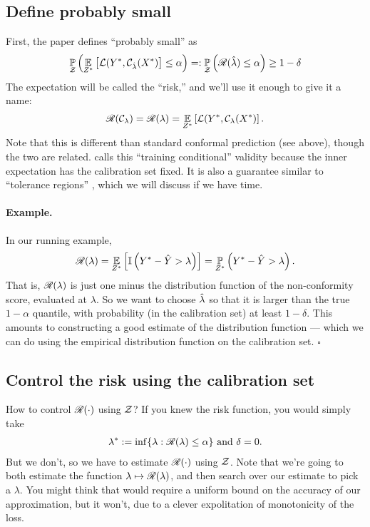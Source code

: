 \documentclass[twoside,11pt]{article}
\numberwithin{equation}{section}
\begin{document}
\subsection{Define probably small} 
First, the paper defines ``probably small'' as
%
\begin{align*}
%
\p{\calset}{
    \expect{\znew}{\loss(\ynew, \cfun_{\lambdahat}(\xnew)} \le \alpha
} =:
\p{\calset}{\risk(\lambdahat) \le \alpha}
\ge 1 - \delta
%
\end{align*}
%
The expectation will be called the ``risk,'' and we'll use it enough
to give it a name:
%
\begin{align*}
%
\risk(\cfun_\lambda) = \risk(\lambda) =
    \expect{\znew}{\loss(\ynew, \cfun_{\lambda}(\xnew)}.
%
\end{align*}
%
Note that this is different than standard conformal prediction (see above),
though the two are related.  \citet{vovk:2012:conditionalconformal} calls this
``training conditional'' validity because the inner expectation has the
calibration set fixed.  It is also a guarantee similar to ``tolerance regions''
\citep{krishnamoorthy:2009:statisticaltoleranceregions}, which we will discuss
if we have time.

\paragraph{Example. }
In our running example,
%
\begin{align*}
%
\risk(\lambda) =
    \expect{\znew}{\ind{\ynew - \yhat > \lambda}} = 
    \p{\znew}{\ynew - \yhat > \lambda}.
%
\end{align*}
%
That is, $\mathscr{R}(\lambda)$ is just one minus the distribution function of the
non-conformity score, evaluated at $\lambda$.  So we want to choose $\hat{\lambda}$
so that it is larger than the true $1-\alpha$ quantile, with probability (in the
calibration set) at least $1-\delta$.  This amounts to constructing a good
estimate of the distribution function --- which we can do using the empirical
distribution function on the calibration set.  $\square$

\subsection{Control the risk using the calibration set} 

How to control $\mathscr{R}(\cdot)$ using $\mathcal{Z}$? 
If you knew the risk function, you would simply take
%
\begin{align*}
    \lambda^{*} := \inf \{ \lambda: \mathscr{R}(\lambda) \le \alpha \}
    \textrm{ and }\delta = 0.
\end{align*}
%
But we don't, so we have to estimate $\mathscr{R}(\cdot)$ using $\mathcal{Z}$. Note that
we're going to both estimate the function $\lambda \mapsto \mathscr{R}(\lambda)$, and
then search over our estimate to pick a $\lambda$.  You might think that would
require a uniform bound on the accuracy of our approximation, but it won't, due
to a clever expolitation of monotonicity of the loss.
\end{document}

